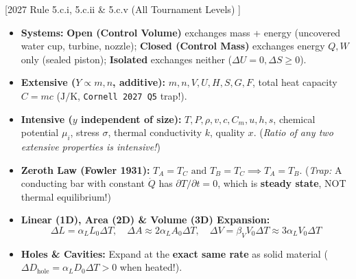 \documentclass[10pt,twoside,openany,letterpaper]{book}
\begin{document}
\begin{quicksheet}\label{qr:03}
[2027 Rule 5.c.i, 5.c.ii \& 5.c.v (All Tournament Levels) ]

\begin{twocol}[0.49]
\begin{formulacard}
\scriptsize
\begin{itemize}
  \item \textbf{Systems:} \textbf{Open (Control Volume)} exchanges mass + energy (uncovered water cup, turbine, nozzle); \textbf{Closed (Control Mass)} exchanges energy $Q, W$ only (sealed piston); \textbf{Isolated} exchanges neither ($\Delta U=0, \Delta S\ge 0$).
  \item \textbf{Extensive ($Y \propto m, n$, additive):} $m, n, V, U, H, S, G, F$, total heat capacity $C = mc$ ($\si{\joule\per\kelvin}$, \texttt{Cornell 2027 Q5} trap!).
  \item \textbf{Intensive ($y$ independent of size):} $T, P, \rho, v, c, C_m, u, h, s$, chemical potential $\mu_i$, stress $\sigma$, thermal conductivity $k$, quality $x$. (\emph{Ratio of any two extensive properties is intensive!})
  \item \textbf{Zeroth Law (Fowler 1931):} $T_A = T_C \text{ and } T_B = T_C \implies T_A = T_B$. (\emph{Trap:} A conducting bar with constant $\dot{Q}$ has $\partial T/\partial t = 0$, which is \textbf{steady state}, NOT thermal equilibrium!)
\end{itemize}
\end{formulacard}
\nextcol[0.49]
\begin{formulacard}
\scriptsize
\begin{itemize}
  \item \textbf{Linear (1D), Area (2D) \& Volume (3D) Expansion:}
  \[
    \Delta L = \alpha_L L_0\Delta T, \quad \Delta A \approx 2\alpha_L A_0\Delta T, \quad \Delta V = \beta_V V_0\Delta T \approx 3\alpha_L V_0\Delta T
  \]
  \item \textbf{Holes \& Cavities:} Expand at the \textbf{exact same rate} as solid material ($\Delta D_{\mathrm{hole}} = \alpha_L D_0\Delta T > 0$ when heated!).

\end{itemize}
\end{formulacard}
\end{twocol}
\end{quicksheet}
\end{document}
